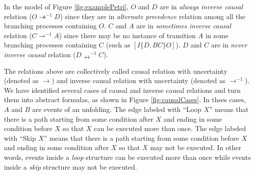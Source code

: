 \documentclass{llncs}
\begin{document}
\begin{example}
In the model of Figure \ref{fig:examplePetri}, $O$ and $D$ are in \textit{always inverse causal} relation ($O\twoheadrightarrow^{-1}D$) since they are in \textit{alternate precedence} relation among all the branching processes containing $O$. $C$ and $A$ are in \textit{sometimes inverse causal} relation ($C\rightharpoonup^{-1}A$) since there may be no instance of transition $A$ in some branching processes containing $C$ (such as $[I\{D,BC\}O]$). $D$ and $C$ are in \textit{never inverse causal} relation ($D\nrightarrow^{-1}C$).
\end{example}

The relations above are collectively called causal relation with uncertainty (denoted as $\rightarrow$) and inverse causal relation with uncertainty (denoted as $\rightarrow^{-1}$). We have identified several cases of causal and inverse causal relations and turn them into abstract formulas, as shown in Figure \ref{fig:causalCases}. In thses cases, $A$ and $B$ are events of an unfolding. The edge labeled with ``Loop $X$'' means that there is a path starting from some condition after $X$ and ending in some condition before $X$ so that $X$ can be executed more than once. The edge labeled with ``Skip $X$'' means that there is a path starting from some condition before $X$ and ending in some condition after $X$ so that $X$ may not be executed. In other words, events inside a \textit{loop} structure can be executed more than once while events inside a \textit{skip} structure may not be executed.
\end{document}
